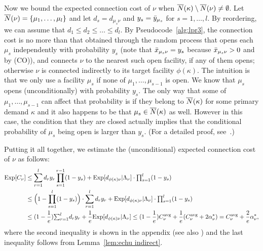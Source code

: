 \documentclass[11pt]{article}
\begin{document}
Now we bound the expected connection cost of $\nu$ when
${\overline{N}}(\kappa)\setminus {\overline{N}}(\nu)\neq\emptyset$.  Let ${\overline{N}}(\nu)
= { \left\{ \mu_1,\ldots,\mu_l \right\} }$ and let $d_s = d_{\mu_s\nu}$ and $y_s =
{\bar y}_{\mu_s}$ for $s = 1,\ldots,l$. By reordering, we can assume that
$d_1 \le d_2 \le \ldots \le d_l$.  By Pseudocode~\ref{alg:lpr3}, the
connection cost is no more than that obtained through the random
process that opens each $\mu_s$ independently with probability $y_{s}$
(note that ${\bar x}_{\mu_s \nu} = y_{s}$ because ${\bar x}_{\mu_s \nu} > 0$
and by (CO)), and connects $\nu$ to the nearest such open facility, if
any of them opens; otherwise $\nu$ is connected indirectly to its
target facility $\phi(\kappa)$. The intuition is that we only use a
facility $\mu_s$ if none of $\mu_1,\ldots,\mu_{s-1}$ is open. We know
that $\mu_s$ opens (unconditionally) with probability $y_{s}$. The
only way that some of $\mu_1,\ldots,\mu_{s-1}$ can affect that
probability is if they belong to ${\overline{N}}(\kappa)$ for some primary
demand $\kappa$ and it also happens to be that $\mu_s \in
{\overline{N}}(\kappa)$ as well. However in this case, the condition that they
are closed actually implies that the conditional probability of
$\mu_s$ being open is larger than $y_{s}$. (For a detailed proof,
see~\cite{ChudakS04}.)

Putting it all together, we estimate the (unconditional) expected 
connection cost of $\nu$ as follows:
%
\begin{align*}
  \mbox{\rm Exp}[C_\nu] &\leq 
	\sum_{r=1}^l d_ry_r\prod_{s=1}^{r-1}(1-y_s)
		+  \mbox{\rm Exp}[ d_{\phi(\kappa)\nu} |\Lambda_\nu]\cdot \textstyle{\prod_{s=1}^{l}} (1-y_{s})
		\\
  &\leq \Big(1 - \prod_{s=1}^l (1-y_s)\Big) \cdot \sum_{r=1}^l d_r y_r
	+  \mbox{\rm Exp}[ d_{\phi(\kappa)\nu} |\Lambda_\nu ]\cdot \textstyle{\prod_{s=1}^{l}} (1-y_{s})
	\\
  &\leq (1-\frac{1}{e}) {\textstyle\sum_{r=1}^l} d_ry_r 
	+ \frac{1}{e} \mbox{\rm Exp}[ d_{\phi(\kappa)\nu} |\Lambda_\nu ]
   \leq (1-\frac{1}{e}) C^{{\mbox{\scriptsize\rm avg}}}_{\nu} 
	+	\frac{1}{e}	(C^{{\mbox{\scriptsize\rm avg}}}_{\nu} + 2\alpha_{\nu}^\ast) = C^{{\mbox{\scriptsize\rm avg}}}_{\nu} + \frac{2}{e}\alpha_{\nu}^\ast,
\end{align*}
%
where the second inequality is shown in the appendix
(see also \cite{ChudakS04}) and the last inequality follows from
Lemma~\ref{lem:echu indirect}. 
\end{document}
